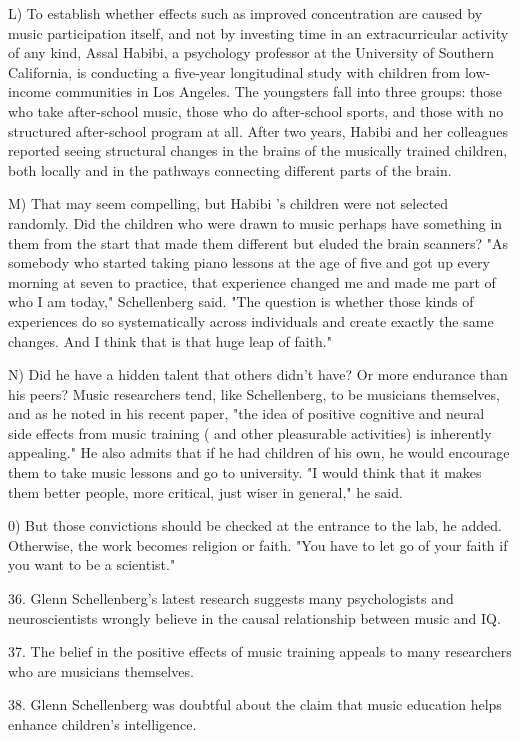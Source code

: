 \documentclass[UTF8,11pt]{ctexart}
\begin{document}
L) To establish whether effects such as improved concentration are caused by music participation itself, and not by investing time in an extracurricular activity of any kind, Assal Habibi, a psychology professor at the University of Southern California, is conducting a five-year longitudinal study with children from low-income communities in Los Angeles. The youngsters fall into three groups: those who take after-school music, those who do after-school sports, and those with no structured after-school program at all. After two years, Habibi and her colleagues reported seeing structural changes in the brains of the musically trained children, both locally and in the pathways connecting different parts of the brain.


M) That may seem compelling, but Habibi 's children were not selected randomly. Did the children who were drawn to music perhaps have something in them from the start that made them different but eluded the brain scanners? "As somebody who started taking piano lessons at the age of five and got up every morning at seven to practice, that experience changed me and made me part of who I am today," Schellenberg said. "The question is whether those kinds of experiences do so systematically across individuals and create exactly the same changes. And I think that is that huge leap of faith."


N) Did he have a hidden talent that others didn't have? Or more endurance than his peers? Music researchers tend, like Schellenberg, to be musicians themselves, and as he noted in his recent paper, "the idea of positive cognitive and neural side effects from music training ( and other pleasurable activities) is inherently appealing." He also admits that if he had children of his own, he would encourage them to take music lessons and go to university. "I would think that it makes them better people, more critical, just wiser in general," he said.


0) But those convictions should be checked at the entrance to the lab, he added. Otherwise, the work becomes religion or faith. "You have to let go of your faith if you want to be a scientist."


36. Glenn Schellenberg's latest research suggests many psychologists and neuroscientists wrongly believe in the causal relationship between music and IQ.


37. The belief in the positive effects of music training appeals to many researchers who are musicians themselves.


38. Glenn Schellenberg was doubtful about the claim that music education helps enhance children's intelligence.
\end{document}
